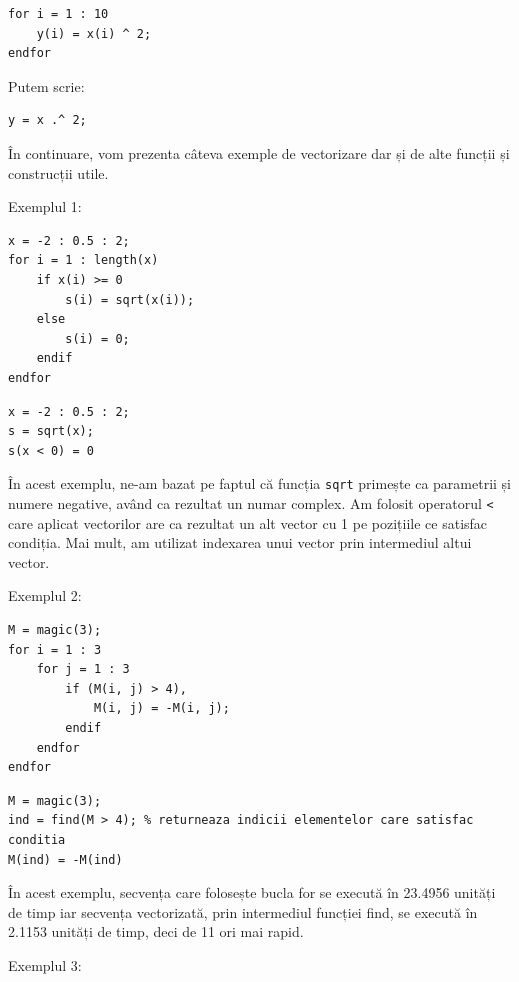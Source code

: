\documentclass{exam}
\begin{document}
\begin{lstlisting}
for i = 1 : 10
	y(i) = x(i) ^ 2;
endfor
\end{lstlisting}

\par Putem scrie:

\begin{lstlisting}
y = x .^ 2;
\end{lstlisting}

\par În continuare, vom prezenta câteva exemple de vectorizare dar și de alte
funcții și construcții utile.

\newpage
\par Exemplul 1:

\begin{lstlisting}
x = -2 : 0.5 : 2;
for i = 1 : length(x)
	if x(i) >= 0
		s(i) = sqrt(x(i));
	else
		s(i) = 0;
 	endif
endfor
\end{lstlisting}

\begin{lstlisting}
x = -2 : 0.5 : 2;
s = sqrt(x);
s(x < 0) = 0
\end{lstlisting}

\par În acest exemplu, ne-am bazat pe faptul că funcția \verb|sqrt| primește ca
parametrii și numere negative, având ca rezultat un numar complex. Am folosit
operatorul \verb|<| care aplicat vectorilor are ca rezultat un alt vector cu 1
pe pozițiile ce satisfac condiția. Mai mult, am utilizat indexarea unui vector
prin intermediul altui vector.

\par Exemplul 2:

\begin{lstlisting}
M = magic(3);
for i = 1 : 3
	for j = 1 : 3
		if (M(i, j) > 4),
			M(i, j) = -M(i, j);
		endif
	endfor
endfor
\end{lstlisting}

\begin{lstlisting}
M = magic(3);
ind = find(M > 4); % returneaza indicii elementelor care satisfac conditia
M(ind) = -M(ind)
\end{lstlisting}

\par În acest exemplu, secvența care folosește bucla for se execută în 23.4956
unități de timp iar secvența vectorizată, prin intermediul funcției find, se
execută în 2.1153 unități de timp, deci de 11 ori mai rapid.

\par Exemplul 3:
\end{document}
